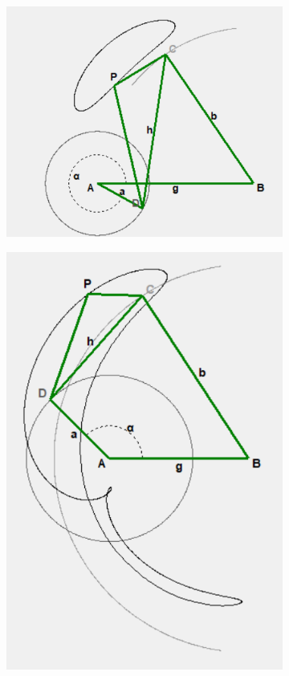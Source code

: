 \documentclass{article}
\begin{document}
\begin{figure}[h]
	\centering
	\begin{subfigure}{0.19\textwidth}
		\centering
		\includegraphics[width=\linewidth, height=0.95\linewidth, keepaspectratio]{./Figures/27_motion_cases/111.png}
		\caption{}
	\end{subfigure}
	\hfill
	\begin{subfigure}{0.19\textwidth}
		\centering
		\includegraphics[width=\linewidth, height=0.95\linewidth, keepaspectratio]{./Figures/27_motion_cases/011.png}

\end{subfigure}
\end{figure}
\end{document}
